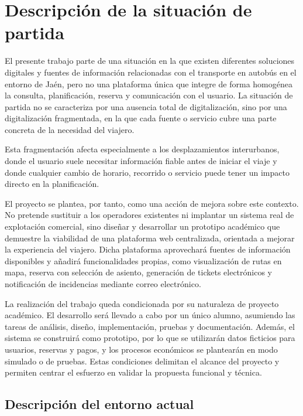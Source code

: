 \section{Descripción de la situación de partida}
\label{sec:situacion-partida}

El presente trabajo parte de una situación en la que existen diferentes soluciones digitales y fuentes de información relacionadas con el transporte en autobús en el entorno de Jaén, pero no una plataforma única que integre de forma homogénea la consulta, planificación, reserva y comunicación con el usuario. La situación de partida no se caracteriza por una ausencia total de digitalización, sino por una digitalización fragmentada, en la que cada fuente o servicio cubre una parte concreta de la necesidad del viajero.

Esta fragmentación afecta especialmente a los desplazamientos interurbanos, donde el usuario suele necesitar información fiable antes de iniciar el viaje y donde cualquier cambio de horario, recorrido o servicio puede tener un impacto directo en la planificación.

El proyecto se plantea, por tanto, como una acción de mejora sobre este contexto. No pretende sustituir a los operadores existentes ni implantar un sistema real de explotación comercial, sino diseñar y desarrollar un prototipo académico que demuestre la viabilidad de una plataforma web centralizada, orientada a mejorar la experiencia del viajero. Dicha plataforma aprovechará fuentes de información disponibles y añadirá funcionalidades propias, como visualización de rutas en mapa, reserva con selección de asiento, generación de tickets electrónicos y notificación de incidencias mediante correo electrónico.

La realización del trabajo queda condicionada por su naturaleza de proyecto académico. El desarrollo será llevado a cabo por un único alumno, asumiendo las tareas de análisis, diseño, implementación, pruebas y documentación. Además, el sistema se construirá como prototipo, por lo que se utilizarán datos ficticios para usuarios, reservas y pagos, y los procesos económicos se plantearán en modo simulado o de pruebas. Estas condiciones delimitan el alcance del proyecto y permiten centrar el esfuerzo en validar la propuesta funcional y técnica.

\subsection{Descripción del entorno actual}

